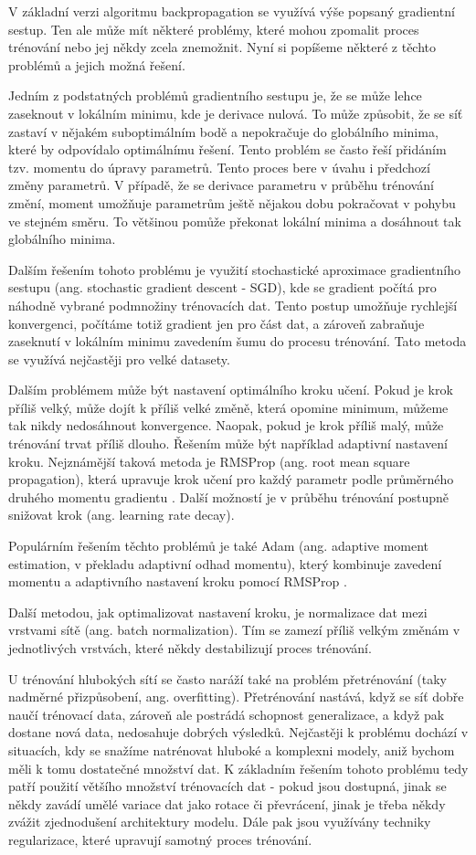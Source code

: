 V základní verzi algoritmu backpropagation se využívá výše popsaný gradientní
sestup. Ten ale může mít některé problémy, které mohou zpomalit proces
trénování nebo jej někdy zcela znemožnit. Nyní si popíšeme některé z těchto
problémů a jejich možná řešení.

Jedním z podstatných problémů gradientního sestupu je, že se může lehce
zaseknout v lokálním minimu, kde je derivace nulová. To může způsobit, že se
síť zastaví v nějakém suboptimálním bodě a nepokračuje do globálního minima,
které by odpovídalo optimálnímu řešení. Tento problém se často řeší přidáním
tzv. momentu do úpravy parametrů. Tento proces bere v úvahu i předchozí změny
parametrů. V případě, že se derivace parametru v průběhu trénování změní,
moment umožňuje parametrům ještě nějakou dobu pokračovat v pohybu ve stejném
směru. To většinou pomůže překonat lokální minima a dosáhnout tak globálního
minima.

Dalším řešením tohoto problému je využití stochastické aproximace gradientního
sestupu (ang. stochastic gradient descent - SGD), kde se gradient počítá pro
náhodně vybrané podmnožiny trénovacích dat. Tento postup umožňuje rychlejší
konvergenci, počítáme totiž gradient jen pro část dat, a zároveň zabraňuje
zaseknutí v lokálním minimu zavedením šumu do procesu trénování. Tato metoda se
využívá nejčastěji pro velké datasety.

Dalším problémem může být nastavení optimálního kroku učení. Pokud je krok
příliš velký, může dojít k příliš velké změně, která opomine minimum, můžeme
tak nikdy nedosáhnout konvergence. Naopak, pokud je krok příliš malý, může
trénování trvat příliš dlouho. Řešením může být například adaptivní nastavení
kroku. Nejznámější taková metoda je RMSProp (ang. root mean square
propagation), která upravuje krok učení pro každý parametr podle průměrného
druhého momentu gradientu \cite{RMSProp}. Další možností je v průběhu trénování
postupně snižovat krok (ang. learning rate decay).

Populárním řešením těchto problémů je také Adam (ang. adaptive moment
estimation, v překladu adaptivní odhad momentu), který kombinuje zavedení
momentu a adaptivního nastavení kroku pomocí RMSProp \cite{adam}.

Další metodou, jak optimalizovat nastavení kroku, je normalizace dat mezi
vrstvami sítě (ang. batch normalization). Tím se zamezí příliš velkým změnám v
jednotlivých vrstvách, které někdy destabilizují proces trénování.

U trénování hlubokých sítí se často naráží také na problém přetrénování (taky
nadměrné přizpůsobení, ang. overfitting). Přetrénování nastává, když se síť
dobře naučí trénovací data, zároveň ale postrádá schopnost generalizace, a když
pak dostane nová data, nedosahuje dobrých výsledků. Nejčastěji k problému
dochází v situacích, kdy se snažíme natrénovat hluboké a komplexni modely, aniž
bychom měli k tomu dostatečné množství dat. K základním řešením tohoto problému
tedy patří použití většího množství trénovacích dat - pokud jsou dostupná,
jinak se někdy zavádí umělé variace dat jako rotace či převrácení, jinak je
třeba někdy zvážit zjednodušení architektury modelu. Dále pak jsou využívány
techniky regularizace, které upravují samotný proces trénování.

